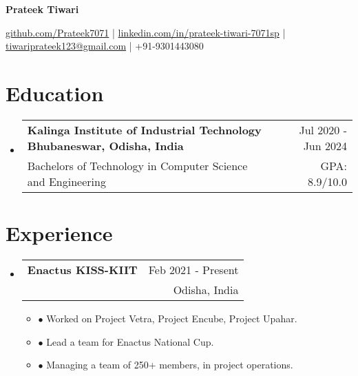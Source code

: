 \documentclass[a4paper,11pt]{article}
\makeatletter
\newcommand{\resumeExp}[4]{
\vspace{0mm}\item[]
    \begin{tabular*}{\textwidth}[t]{l@{\extracolsep{\fill}}r}
        \hspace{-4.4mm} \small\textbf{#1} & {\footnotesize{#3}}\vspace{-1.2mm}\\
        \hspace{-4.3mm} \footnotesize{\text{#2}} & \footnotesize{#4}
    \end{tabular*}
    \vspace{-6.1mm}
}
\newcommand{\resumeEdu}[4]{
\vspace{0mm}\item[]
    \begin{tabular*}{\textwidth}[t]{l@{\extracolsep{\fill}}r}
        \hspace{-4.3mm} \small\textbf{#1} & \footnotesize{#3}\vspace{-1mm} \\
        \hspace{-4.3mm} \footnotesize{#2} & \footnotesize{#4}
    \end{tabular*}
    \vspace{-3.2mm}
}
\newcommand{\resumeSubHeadingListStart}{\begin{itemize}[leftmargin=*,labelsep=0mm,itemsep=-2.5mm]}
\newcommand{\resumeItemListStart}{\begin{justify}\begin{itemize}[leftmargin=3ex, rightmargin=2ex, noitemsep,labelsep=1.2mm,itemsep=0mm]\small}
\newcommand{\resumeSubHeadingListEnd}{\end{itemize}\vspace{-2mm}}
\newcommand{\resumeItemListEnd}{\end{itemize}\end{justify}\vspace{-1.5mm}}
\newcommand{\name}{Prateek Tiwari} %
\newcommand{\phone}{9301443080} %
\newcommand{\emaila}{tiwariprateek123@gmail.com} %
\newcommand{\github}{https://github.com/Prateek7071} %
\newcommand{\linkedin}{https://www.linkedin.com/in/prateek-tiwari-7071sp/} %
\makeatother
\begin{document}
\selectfont


\begin{center}
    \LARGE{\textbf{\name}}
\end{center}
\vspace{-6.5mm}
\begin{center}
    \small{\href{https://github.com/\github}{\faGithub \hspace{0.2mm} github.com/Prateek7071} |  \href{https://www.linkedin.com/in/\linkedin/}{\faLinkedinSquare \hspace{0.2mm} linkedin.com/in/prateek-tiwari-7071sp} | \href{mailto:\emaila}{\faSend \hspace{0.2mm} \emaila} | \faPhone \hspace{0.2mm} +91-\phone }
\end{center}
\vspace{-3mm}


\vspace{-2.5mm}
\section{Education}

\resumeSubHeadingListStart
\resumeEdu
{Kalinga Institute of Industrial Technology Bhubaneswar, Odisha, India} 
{Bachelors of Technology in Computer Science and Engineering} 
{Jul 2020 - Jun 2024} %
{GPA: 8.9/10.0} %
\resumeSubHeadingListEnd
\vspace{-3.5mm}

\section{Experience}
\resumeSubHeadingListStart

\resumeExp
{Enactus KISS-KIIT}
{Director Operations}
{Feb 2021 - Present}
{Odisha, India}
\resumeItemListStart
\item[$\bullet$] Worked on Project Vetra, Project Encube, Project Upahar.
\item[$\bullet$] Lead a team for Enactus National Cup. 
\item[$\bullet$] Managing a team of 250+ members, in project operations.
\resumeItemListEnd

\resumeSubHeadingListEnd
\vspace{-5.5mm}

\end{document}
